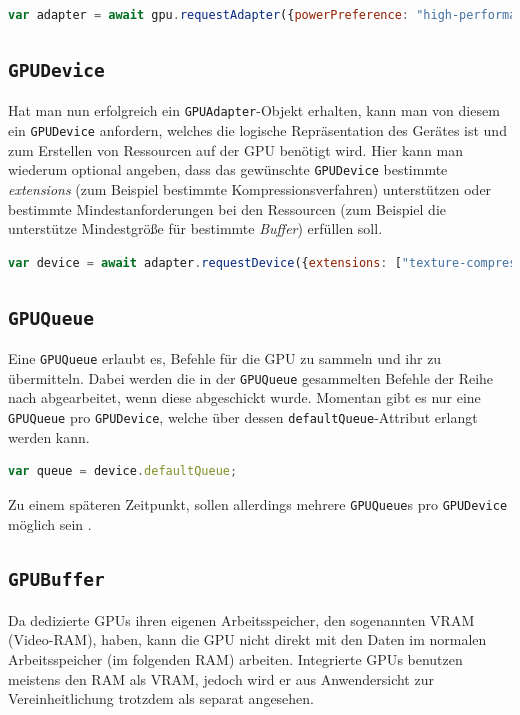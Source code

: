 \documentclass[oneside]{ausarbeitung}
\begin{document}
\begin{lstlisting}[language=JavaScript]
var adapter = await gpu.requestAdapter({powerPreference: "high-performance"});
\end{lstlisting}

\subsection{\texttt{GPUDevice}}

Hat man nun erfolgreich ein \texttt{GPUAdapter}-Objekt erhalten, kann man von diesem ein \texttt{GPUDevice} anfordern, welches die logische Repräsentation des Gerätes ist und zum Erstellen von Ressourcen auf der \ac{GPU} benötigt wird. Hier kann man wiederum optional angeben, dass das gewünschte \texttt{GPUDevice} bestimmte \textit{extensions} (zum Beispiel bestimmte Kompressionsverfahren) unterstützen oder bestimmte Mindestanforderungen bei den Ressourcen (zum Beispiel die unterstütze Mindestgröße für bestimmte \textit{Buffer}) erfüllen soll.

\begin{lstlisting}[language=JavaScript]
var device = await adapter.requestDevice({extensions: ["texture-compression-bc"]});
\end{lstlisting}

\subsection{\texttt{GPUQueue}}

Eine \texttt{GPUQueue} erlaubt es, Befehle für die \ac{GPU} zu sammeln und ihr zu übermitteln. Dabei werden die in der \texttt{GPUQueue} gesammelten Befehle der Reihe nach abgearbeitet, wenn diese abgeschickt wurde. Momentan gibt es nur eine \texttt{GPUQueue} pro \texttt{GPUDevice}, welche über dessen \texttt{defaultQueue}-Attribut erlangt werden kann. 

\begin{lstlisting}[language=JavaScript]
var queue = device.defaultQueue;
\end{lstlisting}

Zu einem späteren Zeitpunkt, sollen allerdings mehrere \texttt{GPUQueue}s pro \texttt{GPUDevice} möglich sein \cite{github:default_queue}.

\subsection{\texttt{GPUBuffer}}
Da dedizierte \ac{GPU}s ihren eigenen Arbeitsspeicher, den sogenannten VRAM (Video-RAM), haben, kann die \ac{GPU} nicht direkt mit den Daten im normalen Arbeitsspeicher (im folgenden RAM) arbeiten. Integrierte \ac{GPU}s benutzen meistens den RAM als VRAM, jedoch wird er aus Anwendersicht zur Vereinheitlichung trotzdem als separat angesehen.
\end{document}
